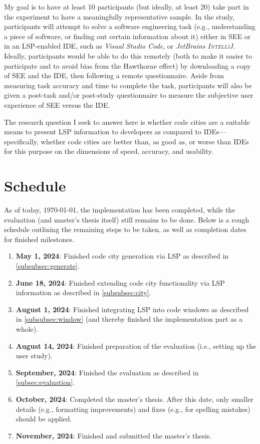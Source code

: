 \documentclass{scrartcl}
\newcommand{\SEE}{\textsc{SEE}}
\begin{document}
{My goal is to have at least 10 participants (but ideally, at least 20) take part in the experiment to have a meaningfully representative sample.
In the study, participants will attempt to solve a software engineering task (e.g., understanding a piece of software, or finding out certain information about it) either in \SEE{} or in an LSP-enabled IDE, such as \textit{Visual Studio Code}, or \textit{JetBrains \textsc{IntelliJ}}.
Ideally, participants would be able to do this remotely (both to make it easier to participate and to avoid bias from the Hawthorne effect) by downloading a copy of \SEE{} and the IDE, then following a remote questionnaire.
Aside from measuring task accuracy and time to complete the task, participants will also be given a post-task and/or post-study questionnaire to measure the subjective user experience of \SEE{} versus the IDE.

The research question I seek to answer here is whether code cities are a suitable means to present LSP information to developers as compared to IDEs---specifically, whether code cities are better than, as good as, or worse than IDEs for this purpose on the dimensions of speed, accuracy, and usability.

\section{Schedule}
As of today, \today{}, the implementation has been completed, while the evaluation (and master's thesis itself) still remains to be done.
Below is a rough schedule outlining the remaining steps to be taken, as well as completion dates for finished milestones.
\begin{enumerate}
    \item \textbf{May 1, 2024}: Finished code city generation via LSP as described in \autoref{subsubsec:generate}.
    \item \textbf{June 18, 2024}: Finished extending code city functionality via LSP information as described in \autoref{subsubsec:city}.
    \item \textbf{August 1, 2024}: Finished integrating LSP into code windows as described in \autoref{subsubsec:window} (and thereby finished the implementation part as a whole).
    \item \textbf{August 14, 2024}: Finished preparation of the evaluation (i.e., setting up the user study).
    \item \textbf{September, 2024}: Finished the evaluation as described in \autoref{subsec:evaluation}.
    \item \textbf{October, 2024}: Completed the master's thesis.
      After this date, only smaller details (e.g., formatting improvements) and fixes (e.g., for spelling mistakes) should be applied.
    \item \textbf{November, 2024}: Finished and submitted the master's thesis.
\end{enumerate}

}
\end{document}
